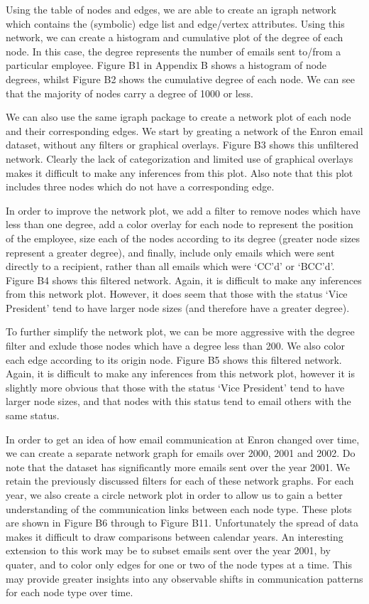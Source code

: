 \documentclass[]{article}
\begin{document}
Using the table of nodes and edges, we are able to create an igraph
network which contains the (symbolic) edge list and edge/vertex
attributes. Using this network, we can create a histogram and cumulative
plot of the degree of each node. In this case, the degree represents the
number of emails sent to/from a particular employee. Figure B1 in
Appendix B shows a histogram of node degrees, whilst Figure B2 shows the
cumulative degree of each node. We can see that the majority of nodes
carry a degree of 1000 or less.

We can also use the same igraph package to create a network plot of each
node and their corresponding edges. We start by greating a network of
the Enron email dataset, without any filters or graphical overlays.
Figure B3 shows this unfiltered network. Clearly the lack of
categorization and limited use of graphical overlays makes it difficult
to make any inferences from this plot. Also note that this plot includes
three nodes which do not have a corresponding edge.

In order to improve the network plot, we add a filter to remove nodes
which have less than one degree, add a color overlay for each node to
represent the position of the employee, size each of the nodes according
to its degree (greater node sizes represent a greater degree), and
finally, include only emails which were sent directly to a recipient,
rather than all emails which were `CC'd' or `BCC'd'. Figure B4 shows
this filtered network. Again, it is difficult to make any inferences
from this network plot. However, it does seem that those with the status
`Vice President' tend to have larger node sizes (and therefore have a
greater degree).

To further simplify the network plot, we can be more aggressive with the
degree filter and exlude those nodes which have a degree less than 200.
We also color each edge according to its origin node. Figure B5 shows
this filtered network. Again, it is difficult to make any inferences
from this network plot, however it is slightly more obvious that those
with the status `Vice President' tend to have larger node sizes, and
that nodes with this status tend to email others with the same status.

In order to get an idea of how email communication at Enron changed over
time, we can create a separate network graph for emails over 2000, 2001
and 2002. Do note that the dataset has significantly more emails sent
over the year 2001. We retain the previously discussed filters for each
of these network graphs. For each year, we also create a circle network
plot in order to allow us to gain a better understanding of the
communication links between each node type. These plots are shown in
Figure B6 through to Figure B11. Unfortunately the spread of data makes
it difficult to draw comparisons between calendar years. An interesting
extension to this work may be to subset emails sent over the year 2001,
by quater, and to color only edges for one or two of the node types at a
time. This may provide greater insights into any observable shifts in
communication patterns for each node type over time.
\end{document}
